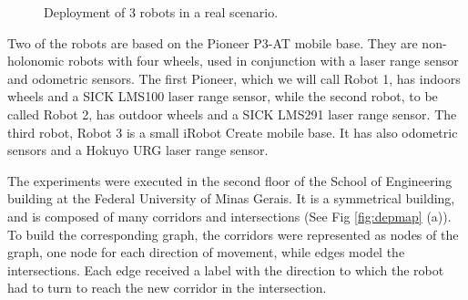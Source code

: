 \documentclass[smallcondensed]{svjour3}
\begin{document}
\begin{figure}[h]
\centering
{}
\caption{Deployment of 3 robots in a real scenario.}
\label{fig:depmapDeploy}
\end{figure}

Two of the robots are based on the Pioneer P3-AT mobile base. They are non-holonomic robots with four wheels, used in conjunction with a laser range sensor and odometric sensors. The first Pioneer, which we will call Robot 1, has indoors wheels and a SICK LMS100 laser range sensor, while the second robot, to be called Robot 2, has outdoor wheels and a SICK LMS291 laser range sensor. 
%
The third robot, Robot 3 is a small iRobot Create mobile base. It has also odometric sensors and a Hokuyo URG laser range sensor. 

The experiments were executed in the second floor of the School of Engineering building at the Federal University of Minas Gerais. It is a symmetrical building, and is composed of many corridors and intersections (See Fig \ref{fig:depmap} (a)). To build the corresponding graph, the corridors were represented as nodes of the graph, one node for each direction of movement, while edges model the intersections. Each edge received a label with the direction to which the robot had to turn to reach the new corridor in the intersection.
\end{document}
